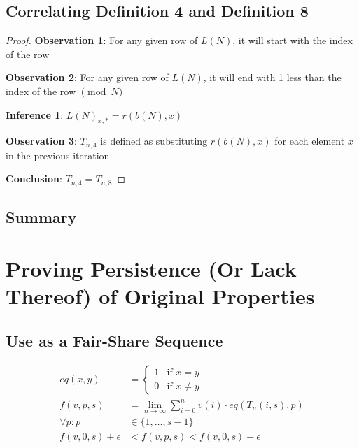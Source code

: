 \documentclass[conference]{IEEEtran}
\begin{document}
\subsection{Correlating Definition 4 and Definition 8}

\begin{proof}
\par\noindent\par
    \textbf{Observation 1}: For any given row of $L(N)$, it will start with the index of the row

    \textbf{Observation 2}: For any given row of $L(N)$, it will end with 1 less than the index of the row $\pmod{N}$

    \textbf{Inference 1}: $L(N)_{x,*} = r(b(N), x)$

    \textbf{Observation 3}: $T_{n,4}$ is defined as substituting $r(b(N),x)$ for each element $x$ in the previous iteration

    \textbf{Conclusion}: $T_{n,4} = T_{n,8}$
\end{proof}

\subsection{Summary}

\section{Proving Persistence (Or Lack Thereof) of Original Properties}

\subsection{Use as a Fair-Share Sequence}


\begin{equation}
\begin{aligned}
             eq(x, y) &= \begin{cases}
                     1& \text{if } x = y \\
                     0& \text{if } x \ne y
              \end{cases} \\
           f(v, p, s) &= \lim_{n \to \infty} \sum_{i=0}^n v(i) \cdot eq(T_n(i, s), p) \\
        \forall p : p &\in \{1, \dots, s-1\}\\
f(v, 0, s) + \epsilon &< f(v, p, s) < f(v, 0, s) - \epsilon
\end{aligned}
\end{equation}
\end{document}
